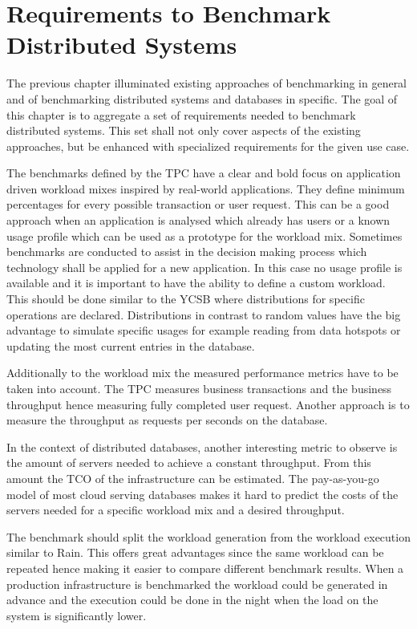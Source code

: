
\chapter{Requirements to Benchmark Distributed Systems}
\label{cha:requirements}
The previous chapter illuminated existing approaches of benchmarking in general and of benchmarking distributed systems and databases in specific. The goal of this chapter is to aggregate a set of requirements needed to benchmark distributed systems. This set shall not only cover aspects of the existing approaches, but be enhanced with specialized requirements for the given use case.

The benchmarks defined by the \ac{TPC} have a clear and bold focus on application driven workload mixes inspired by real-world applications. They define minimum percentages for every possible transaction or user request. This can be a good approach when an application is analysed which already has users or a known usage profile which can be used as a prototype for the workload mix. Sometimes benchmarks are conducted to assist in the decision making process which technology shall be applied for a new application. In this case no usage profile is available and it is important to have the ability to define a custom workload. This should be done similar to the YCSB where distributions for specific operations are declared. Distributions in contrast to random values have the big advantage to simulate specific usages for example reading from data hotspots or updating the most current entries in the database.

Additionally to the workload mix the measured performance metrics have to be taken into account. The \ac{TPC} measures business transactions and the business throughput hence measuring fully completed user request. Another approach is to measure the throughput as requests per seconds on the database.

In the context of distributed databases, another interesting metric to observe is the amount of servers needed to achieve a constant throughput. From this amount the \ac{TCO} of the infrastructure can be estimated. The pay-as-you-go model of most cloud serving databases makes it hard to predict the costs of the servers needed for a specific workload mix and a desired throughput.

The benchmark should split the workload generation from the workload execution similar to Rain. This offers great advantages since the same workload can be repeated hence making it easier to compare different benchmark results. When a production infrastructure is benchmarked the workload could be generated in advance and the execution could be done in the night when the load on the system is significantly lower.

